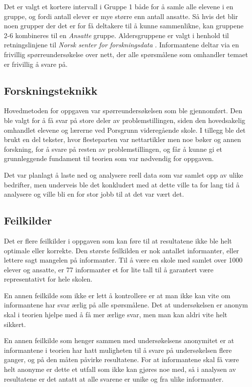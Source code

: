 Det er valgt et kortere intervall i Gruppe 1 både for å samle alle elevene i en gruppe, og fordi antall elever er mye større enn antall ansatte. Så hvis det blir noen grupper der det er for få deltakere til å kunne sammenlikne, kan gruppene 2-6 kombineres til en \textit{Ansatte} gruppe. Aldersgruppene er valgt i henhold til retningslinjene til \textit{Norsk senter for forskningsdata} \parencite{artikkel:nsd_forsknig}. Informantene deltar via en frivillig spørreundersøkelse over nett, der alle spørsmålene som omhandler temaet er frivillig å svare på. 
\vfill

\subsection{Forskningsteknikk}
Hovedmetoden for oppgaven var spørreundersøkelsen som ble gjennomført. Den ble valgt for å få svar på store deler av problemstillingen, siden den hovedsakelig omhandlet elevene og lærerne ved Porsgrunn videregående skole. I tillegg ble det brukt en del tekster, hvor flesteparten var nettartikler men noe bøker og annen forskning, for å svare på resten av problemstillingen, og får å kunne gi et grunnleggende fundament til teorien som var nødvendig for oppgaven.

Det var planlagt å laste ned og analysere reell data som var samlet opp av ulike bedrifter, men underveis ble det konkludert med at dette ville ta for lang tid å analysere og ville bli en for stor jobb til at det var vært det.

\subsection{Feilkilder}
Det er flere feilkilder i oppgaven som kan føre til at resultatene ikke ble helt optimale eller korrekte. Den største feilkilden er nok antallet informanter, eller lettere sagt mangelen på informanter. Til å være en skole med samlet over 1000 elever og ansatte, er 77 informanter et for lite tall til å garantert være representativt for hele skolen.

En annen feilkilde som ikke er lett å kontrollere er at man ikke kan vite om informantene har svar ærlig på alle spørsmålene. Det at undersøkelsen er anonym skal i teorien hjelpe med å få mer ærlige svar, men man kan aldri vite helt sikkert.

En annen feilkilde som henger sammen med undersøkelsens anonymitet er at informantene i teorien har hatt muligheten til å svare på undersøkelsen flere ganger, og på den måten påvirke resultatene. For at informantene skal få være helt anonyme er dette et utfall som ikke kan gjøres noe med, så i analysen av resultatene er det antatt at alle svarene er unike og fra ulike informanter.

\newpage